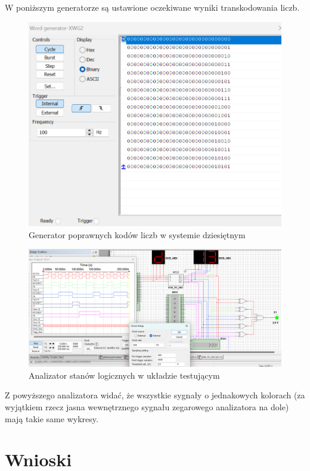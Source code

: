 \documentclass{article}
\begin{document}
    W poniższym generatorze są ustawione oczekiwane wyniki transkodowania liczb.
    \begin{figure}[H]
        \centering
        \captionsetup{font=small, skip=2pt}
        \includegraphics[scale=0.7]{images/generator2}
        \caption{Generator poprawnych kodów liczb w systemie dziesiętnym}
    \end{figure}

    \begin{figure}[H]
        \centering
        \captionsetup{font=small, skip=2pt}
        \includegraphics[scale=0.5]{images/analizator_test}
        \caption{Analizator stanów logicznych w układzie testującym}
    \end{figure}
    Z powyższego analizatora widać, że wszystkie sygnały o jednakowych kolorach (za wyjątkiem rzecz jasna
    wewnętrznego sygnału zegarowego analizatora na dole) mają takie same wykresy. 

    \section{Wnioski}
    
\end{document}
